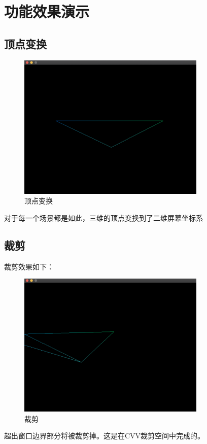 

    \chapter{功能效果演示}

    \section{顶点变换}
	\begin{figure}[H]
    	\centering
		\includegraphics[width=0.8\textwidth]{images/demo1.png}
		\caption{顶点变换}
		\label{demo1}
    \end{figure}    
    
    对于每一个场景都是如此，三维的顶点变换到了二维屏幕坐标系

    \section{裁剪}
    裁剪效果如下：
    	\begin{figure}[H]
    	\centering
		\includegraphics[width=0.8\textwidth]{images/demo2.png}
		\caption{裁剪}
		\label{demo2}
    \end{figure}  
    超出窗口边界部分将被裁剪掉。这是在CVV裁剪空间中完成的。
    	   

